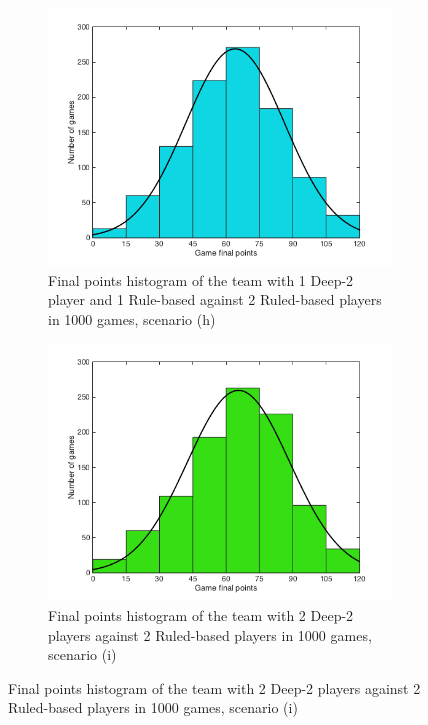\begin{figure}[h]
  \centering
	\begin{subfigure}[h]{0.49\textwidth}
    	\includegraphics[width=\textwidth]{./img/appendix/histH}
    	\caption{Final points histogram of the team with 1 Deep-2 player and 1 Rule-based against 2 Ruled-based players in 1000 games, scenario (h)}
    \end{subfigure}
    \begin{subfigure}[h]{0.49\textwidth}
    	\includegraphics[width=\textwidth]{./img/appendix/histI}
    	\caption{Final points histogram of the team with 2 Deep-2 players against 2 Ruled-based players in 1000 games, scenario (i)}
    \end{subfigure}
\label{app:histogramHI}
\end{figure}

\thispagestyle{empty}